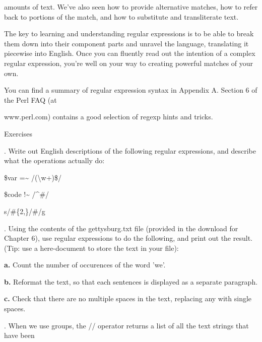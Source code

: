 \documentclass[a4paper,11pt]{book}
\begin{document}
\noindent amounts of text. We've also seen how to provide alternative matches, how to refer back to portions of the match, and how to substitute and transliterate text.

\noindent 

\noindent The key to learning and understanding regular expressions is to be able to break them down into their component parts and unravel the language, translating it piecewise into English. Once you can fluently read out the intention of a complex regular expression, you're well on your way to creating powerful matches of your own.

\noindent 

\noindent You can find a summary of regular expression syntax in Appendix A. Section 6 of the Perl FAQ (at

\noindent www.perl.com) contains a good selection of regexp hints and tricks.

\noindent 

\noindent 

\noindent Exercises

\noindent 

.   Write out English descriptions of the following regular expressions, and describe what the operations actually do:

\noindent 

\noindent \$var =\~{} /(\textbackslash w+)\$/

\noindent 

\noindent \$code !\~{} /\^{}\#/

\noindent 

\noindent s/\#\{2,\}/\#/g

\noindent 

.   Using the contents of the gettysburg.txt file (provided in the download for Chapter 6), use regular expressions to do the following, and print out the result. (Tip: use a here-document to store the text in your file):

\noindent \textbf{a. }Count the number of occurences of the word 'we'.

\noindent \textbf{b. }Reformat the text, so that each sentences is displayed as a separate paragraph.

\noindent \textbf{c. }Check that there are no multiple spaces in the text, replacing any with single spaces.

.   When we use groups, the // operator returns a list of all the text strings that have been
\end{document}
